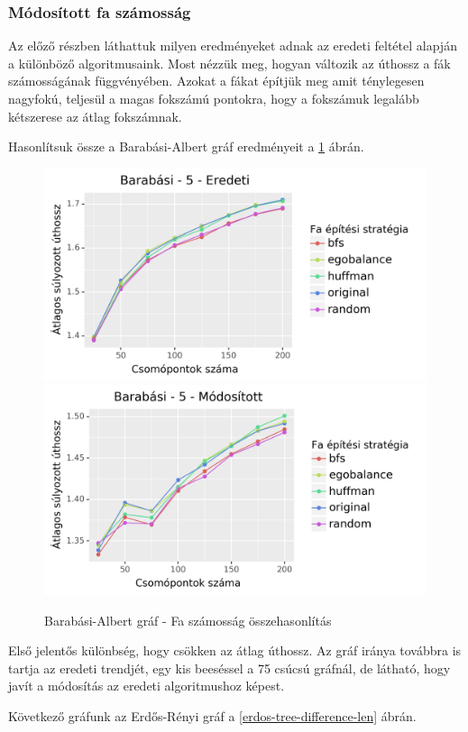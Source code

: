 \documentclass[12pt]{report}
\begin{document}
\subsubsection{Módosított fa számosság}

Az előző részben láthattuk milyen eredményeket adnak az eredeti feltétel alapján a különböző algoritmusaink.
Most nézzük meg, hogyan változik az úthossz a fák számosságának függvényében. 
Azokat a fákat építjük meg amit ténylegesen nagyfokú, teljesül a magas fokszámú pontokra, hogy a fokszámuk legalább kétszerese az átlag fokszámnak.

Hasonlítsuk össze a Barabási-Albert gráf eredményeit a \ref{barabasi-tree-difference-len} ábrán.

\begin{figure}[H]
	\begin{center}
		\includegraphics[width=0.49\linewidth]{pictures/barabasi_len_e.png}
		\includegraphics[width=0.49\linewidth]{pictures/barabasi_len_m.png}
		\caption{Barabási-Albert gráf - Fa számosság összehasonlítás}
		\label{barabasi-tree-difference-len}
	\end{center}
\end{figure}

Első jelentős különbség, hogy csökken az átlag úthossz.
Az gráf iránya továbbra is tartja az eredeti trendjét, egy kis beeséssel a 75 csúcsú gráfnál, de látható, hogy javít a módosítás az eredeti algoritmushoz képest.

Következő gráfunk az Erdős-Rényi gráf a \ref{erdos-tree-difference-len} ábrán.
\end{document}
